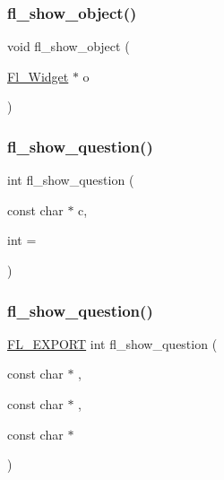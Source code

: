 \mbox{\label{forms_8_h_a24ae0d1af80df0af244d3bdba925b877}} 
\subsubsection{\texorpdfstring{fl\+\_\+show\+\_\+object()}{fl\_show\_object()}}
{\footnotesize\ttfamily void fl\+\_\+show\+\_\+object (\begin{DoxyParamCaption}\item[{\hyperlink{class_fl___widget}{Fl\+\_\+\+Widget} $\ast$}]{o }\end{DoxyParamCaption})\hspace{0.3cm}{\ttfamily [inline]}}

\mbox{\label{forms_8_h_a1708944c15d2f2aec43800a40e04c008}} 
\subsubsection{\texorpdfstring{fl\+\_\+show\+\_\+question()}{fl\_show\_question()}\hspace{0.1cm}{\footnotesize\ttfamily [1/2]}}
{\footnotesize\ttfamily int fl\+\_\+show\+\_\+question (\begin{DoxyParamCaption}\item[{const char $\ast$}]{c,  }\item[{int}]{ = {} }\end{DoxyParamCaption})\hspace{0.3cm}{\ttfamily [inline]}}

\mbox{\label{forms_8_h_aab7d9d933986379811e71fb9f9105d36}} 
\subsubsection{\texorpdfstring{fl\+\_\+show\+\_\+question()}{fl\_show\_question()}\hspace{0.1cm}{\footnotesize\ttfamily [2/2]}}
{\footnotesize\ttfamily \hyperlink{_fl___export_8_h_aa9ba29a18aee9d738370a06eeb4470fc}{F\+L\+\_\+\+E\+X\+P\+O\+RT} int fl\+\_\+show\+\_\+question (\begin{DoxyParamCaption}\item[{const char $\ast$}]{,  }\item[{const char $\ast$}]{,  }\item[{const char $\ast$}]{ }\end{DoxyParamCaption})}

